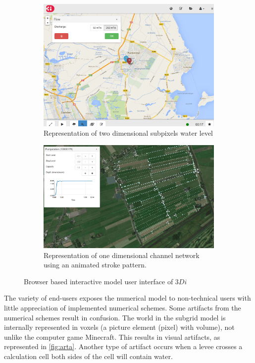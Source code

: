 \documentclass[a4paper]{article}
\DeclareRobustCommand{\threedi}{$3Di$~}
\begin{document}
\begin{figure}[htbp]
  \centering

  \begin{subfigure}{0.4\textwidth}
    \includegraphics[width=1\textwidth]{webgui}
    \caption{Representation of two dimensional subpixels water level}
    \label{fig:twod}
  \end{subfigure}
  \begin{subfigure}{0.4\textwidth}
    \includegraphics[width=1\textwidth]{oned}

    \caption{Representation of one dimensional channel network using an animated stroke pattern.}
    \label{fig:oned}
  \end{subfigure}
  \label{fig:gui}
  \caption{Browser based interactive model user interface of \threedi}
\end{figure}

The variety of end-users exposes the numerical model to non-technical users with little appreciation of implemented numerical schemes. Some artifacts from the numerical schemes result in confusion. The world in the subgrid model is internally represented in voxels (a picture element (pixel) with volume), not unlike the computer game Minecraft. This results in visual artifacts, as represented in \autoref{fig:arta}. Another type of artifact occurs when a levee crosses a calculation cell both sides of the cell will contain water.
\end{document}

